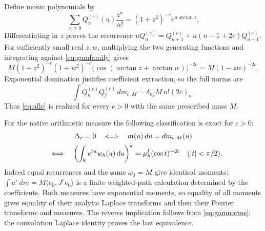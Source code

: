 \documentclass[11pt]{article}
\begin{document}
Define monic polynomials by
\begin{equation}\label{eq:genfamily}
 \sum_{n\geq0}Q_n^{(c)}(u)\frac{z^n}{n!}
       =(1+z^2)^{-c}e^{u\arctan z}.
\end{equation}
Differentiating in $z$ proves the recurrence
$uQ_n^{(c)}=Q_{n+1}^{(c)}+n(n-1+2c)Q_{n-1}^{(c)}$.
For sufficiently small real $z,w$, multiplying the two
generating functions and integrating against
\eqref{eq:gamfamily} gives
\[
 M(1+z^2)^{-c}(1+w^2)^{-c}
       \bigl(\cos(\arctan z+\arctan w)\bigr)^{-2c}
       =M(1-zw)^{-2c}.
\]
Exponential domination justifies coefficient extraction,
so the full norms are
\begin{equation}\label{eq:gamnorms}
 \int Q_n^{(c)}Q_j^{(c)}\,dm_{c,M}
       =\delta_{nj}M\,n!(2c)_n .
\end{equation}
Thus \eqref{eq:allc} is realized for every $c>0$ with the
same prescribed mass $M$.

For the native arithmetic measure the following classification
is exact for $c>0$:
\begin{equation}\label{eq:exacttest}
 \begin{gathered}
 \Delta_c=0
 \quad\Longleftrightarrow\quad m(u)\,du=dm_{c,M}(u)\\
 \quad\Longleftrightarrow\quad
 \left(\int_\mathbb R e^{tu}w_h(u)\,du\right)^k
          =\mu_h^k(\cos t)^{-2c}\quad(|t|<\pi/2).
 \end{gathered}
\end{equation}
Indeed equal recurrences and the same $\omega_0=M$ give
identical moments:
$\int u^r\,dm=M\langle e_0,J^re_0\rangle$ is a finite
weighted-path calculation determined by the coefficients.
Both measures have exponential moments, so equality of
all moments gives equality of their analytic Laplace
transforms and then their Fourier transforms and measures.
The reverse implication follows from \eqref{eq:gamnorms};
the convolution Laplace identity proves the last equivalence.
\end{document}
